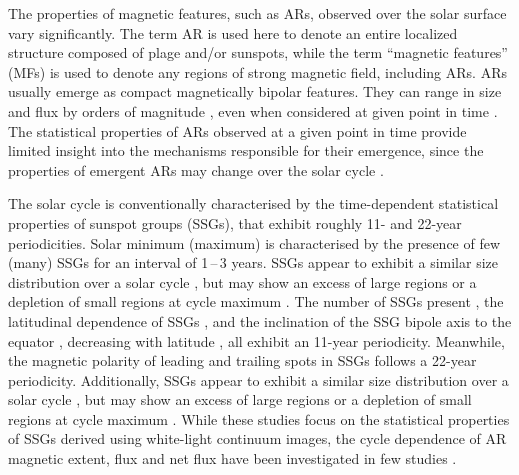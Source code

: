 \documentclass[namedreferences]{solarphysics}
\begin{document}
\begin{article}
The properties of magnetic features, such as ARs, observed over the solar surface vary significantly. The term AR is used here to denote an entire localized structure composed of plage and/or sunspots, while the term ``magnetic features'' (MFs) is used to denote any regions of strong magnetic field, including ARs. ARs usually emerge as compact magnetically bipolar features. They can range in size and flux by orders of magnitude \citep{meunier:2003}, even when considered at given point in time \citep{Parnell:2009}. The statistical properties of ARs observed at a given point in time provide limited insight into the mechanisms responsible for their emergence, since the properties of emergent ARs may change over the solar cycle \citep{meunier:2003,Lefevre:2011}.


The solar cycle is conventionally characterised by the time-dependent statistical properties of sunspot groups (SSGs), that exhibit roughly 11- and 22-year periodicities. Solar minimum (maximum) is characterised by the presence of few (many) SSGs for an interval of 1\,--\,3 years. 
SSGs appear to exhibit a similar size distribution over a solar cycle \citep{harvey:1993}, but may show an excess of large regions or a depletion of small regions at cycle maximum \citep{tang:1984,Hathaway:2010b,Lefevre:2011,Kilcik:2011,deToma:2013}.
The number of SSGs present \citep[sunspot number:][]{Schwabe:1844,Wolf:1861}, the latitudinal dependence of SSGs \citep[Sp$\ddot{\mbox{o}}$rer's law:][]{Maunder:1904}, and the inclination of the SSG bipole axis to the equator \cite[Joy's Law:][]{Hale:1919}, decreasing with latitude \citep{Howard:1991}, all exhibit an 11-year periodicity. Meanwhile, the magnetic polarity of leading and trailing spots in SSGs \citep[Hale's law;][]{Hale:1919} follows a 22-year periodicity.
Additionally, SSGs appear to exhibit a similar size distribution over a solar cycle \citep{harvey:1993}, but may show an excess of large regions or a depletion of small regions at cycle maximum \citep{tang:1984,Hathaway:2010b,Lefevre:2011,Kilcik:2011,deToma:2013}.
While these studies focus on the statistical properties of SSGs derived using white-light continuum images, the cycle dependence of AR magnetic extent, flux and net flux have been investigated in few studies \citep[e.g.,][]{meunier:2003,zharkov:2006}.


\end{article}
\end{document}
